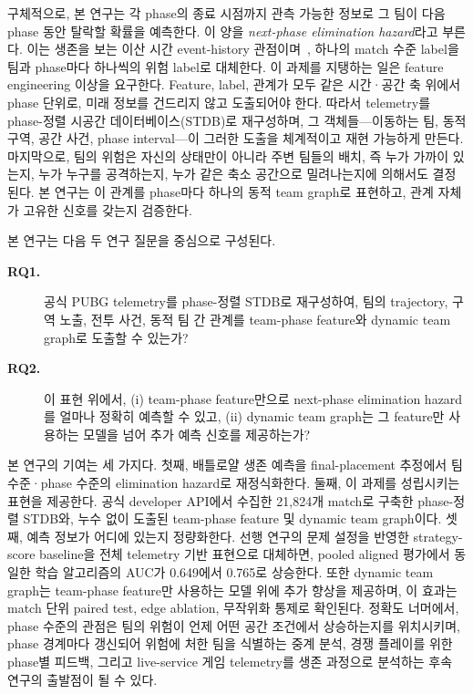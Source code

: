 구체적으로, 본 연구는 각 phase의 종료 시점까지 관측 가능한 정보로 그 팀이
다음 phase 동안 탈락할 확률을 예측한다. 이 양을 \textit{next-phase
elimination hazard}라고 부른다. 이는 생존을 보는 이산 시간 event-history
관점이며~\cite{allison1982discrete,singer1993discrete}, 하나의 match 수준
label을 팀과 phase마다 하나씩의 위험 label로 대체한다. 이 과제를 지탱하는
일은 feature engineering 이상을 요구한다. Feature, label, 관계가 모두 같은
시간·공간 축 위에서 phase 단위로, 미래 정보를 건드리지 않고 도출되어야
한다. 따라서 telemetry를 phase-정렬 시공간 데이터베이스(STDB)로
재구성하며, 그 객체들---이동하는 팀, 동적 구역, 공간 사건, phase
interval---이 그러한 도출을 체계적이고 재현 가능하게 만든다. 마지막으로,
팀의 위험은 자신의 상태만이 아니라 주변 팀들의 배치, 즉 누가 가까이
있는지, 누가 누구를 공격하는지, 누가 같은 축소 공간으로 밀려나는지에
의해서도 결정된다. 본 연구는 이 관계를 phase마다 하나의 동적 team graph로
표현하고, 관계 자체가 고유한 신호를 갖는지 검증한다.

본 연구는 다음 두 연구 질문을 중심으로 구성된다.
\begin{description}
  \item[\textbf{RQ1.}] 공식 PUBG telemetry를 phase-정렬 STDB로 재구성하여, 팀의 trajectory, 구역 노출, 전투 사건, 동적 팀 간 관계를 team-phase feature와 dynamic team graph로 도출할 수 있는가?
  \item[\textbf{RQ2.}] 이 표현 위에서, (i) team-phase feature만으로 next-phase elimination hazard를 얼마나 정확히 예측할 수 있고, (ii) dynamic team graph는 그 feature만 사용하는 모델을 넘어 추가 예측 신호를 제공하는가?
\end{description}

본 연구의 기여는 세 가지다. 첫째, 배틀로얄 생존 예측을 final-placement
추정에서 팀 수준·phase 수준의 elimination hazard로 재정식화한다. 둘째, 이
과제를 성립시키는 표현을 제공한다. 공식 developer API에서 수집한 21,824개
match로 구축한 phase-정렬 STDB와, 누수 없이 도출된 team-phase feature 및
dynamic team graph이다. 셋째, 예측 정보가 어디에 있는지 정량화한다. 선행
연구의 문제 설정을 반영한 strategy-score baseline을 전체 telemetry 기반
표현으로 대체하면, pooled aligned 평가에서 동일한 학습 알고리즘의 AUC가
0.649에서 0.765로 상승한다. 또한 dynamic team graph는 team-phase feature만 사용하는 모델
위에 추가 향상을 제공하며, 이 효과는 match 단위 paired test, edge
ablation, 무작위화 통제로 확인된다. 정확도 너머에서, phase 수준의 관점은
팀의 위험이 언제 어떤 공간 조건에서 상승하는지를 위치시키며, phase 경계마다 갱신되어
위험에 처한 팀을 식별하는 중계 분석, 경쟁 플레이를 위한 phase별 피드백, 그리고
live-service 게임 telemetry를 생존 과정으로 분석하는 후속 연구의 출발점이
될 수 있다.
